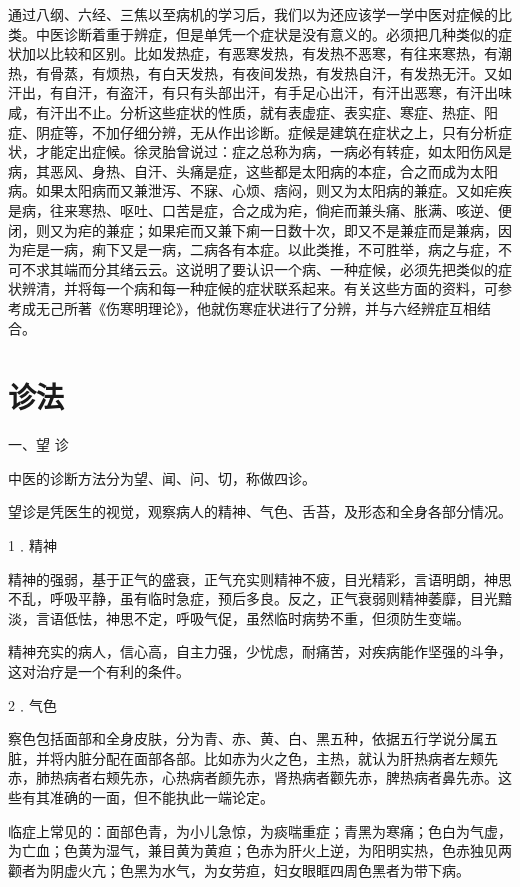\documentclass[a4paper,12pt,UTF8,twoside]{ctexbook}
\begin{document}
通过八纲、六经、三焦以至病机的学习后，我们以为还应该学一学中医对症候的比类。中医诊断着重于辨症，但是单凭一个症状是没有意义的。必须把几种类似的症状加以比较和区别。比如发热症，有恶寒发热，有发热不恶寒，有往来寒热，有潮热，有骨蒸，有烦热，有白天发热，有夜间发热，有发热自汗，有发热无汗。又如汗出，有自汗，有盗汗，有只有头部出汗，有手足心出汗，有汗出恶寒，有汗出味咸，有汗出不止。分析这些症状的性质，就有表虚症、表实症、寒症、热症、阳症、阴症等，不加仔细分辨，无从作出诊断。症候是建筑在症状之上，只有分析症状，才能定出症候。徐灵胎曾说过：症之总称为病，一病必有转症，如太阳伤风是病，其恶风、身热、自汗、头痛是症，这些都是太阳病的本症，合之而成为太阳病。如果太阳病而又兼泄泻、不寐、心烦、痞闷，则又为太阳病的兼症。又如疟疾是病，往来寒热、呕吐、口苦是症，合之成为疟，倘疟而兼头痛、胀满、咳逆、便闭，则又为疟的兼症；如果疟而又兼下痢一日数十次，即又不是兼症而是兼病，因为疟是一病，痢下又是一病，二病各有本症。以此类推，不可胜举，病之与症，不可不求其端而分其绪云云。这说明了要认识一个病、一种症候，必须先把类似的症状辨清，并将每一个病和每一种症候的症状联系起来。有关这些方面的资料，可参考成无己所著《伤寒明理论》，他就伤寒症状进行了分辨，并与六经辨症互相结合。

\section{诊法}

一、望 诊

中医的诊断方法分为望、闻、问、切，称做四诊。

望诊是凭医生的视觉，观察病人的精神、气色、舌苔，及形态和全身各部分情况。

1﹒精神

精神的强弱，基于正气的盛衰，正气充实则精神不疲，目光精彩，言语明朗，神思不乱，呼吸平静，虽有临时急症，预后多良。反之，正气衰弱则精神萎靡，目光黯淡，言语低怯，神思不定，呼吸气促，虽然临时病势不重，但须防生变端。

精神充实的病人，信心高，自主力强，少忧虑，耐痛苦，对疾病能作坚强的斗争，这对治疗是一个有利的条件。

2﹒气色

察色包括面部和全身皮肤，分为青、赤、黄、白、黑五种，依据五行学说分属五脏，并将内脏分配在面部各部。比如赤为火之色，主热，就认为肝热病者左颊先赤，肺热病者右颊先赤，心热病者颜先赤，肾热病者颧先赤，脾热病者鼻先赤。这些有其准确的一面，但不能执此一端论定。

临症上常见的：面部色青，为小儿急惊，为痰喘重症；青黑为寒痛；色白为气虚，为亡血；色黄为湿气，兼目黄为黄疸；色赤为肝火上逆，为阳明实热，色赤独见两颧者为阴虚火亢；色黑为水气，为女劳疸，妇女眼眶四周色黑者为带下病。
\end{document}
